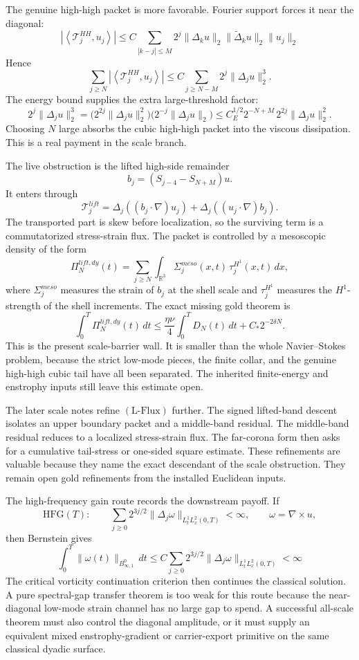 The genuine high-high packet is more favorable.  Fourier support forces it
near the diagonal:
\[
  \left|
  \left\langle
  \mathcal T^{HH}_j,u_j
  \right\rangle
  \right|
  \le
  C\sum_{|k-j|\le M}
  2^j\|\Delta_k u\|_2
  \|\widetilde\Delta_k u\|_2
  \|u_j\|_2
\]
Hence
\[
  \sum_{j\ge N}
  \left|
  \left\langle
  \mathcal T^{HH}_j,u_j
  \right\rangle
  \right|
  \le
  C\sum_{j\ge N-M}2^j\|\Delta_j u\|_2^3.
\]
The energy bound supplies the extra large-threshold factor:
\[
  2^j\|\Delta_j u\|_2^3
  =
  \bigl(2^{2j}\|\Delta_j u\|_2^2\bigr)
  \bigl(2^{-j}\|\Delta_j u\|_2\bigr)
  \le
  C_E^{1/2}2^{-N+M}\,
  2^{2j}\|\Delta_j u\|_2^2.
\]
Choosing \(N\) large absorbs the cubic high-high packet into the viscous
dissipation.  This is a real payment in the scale branch.

The live obstruction is the lifted high-side remainder
\[
  b_j=(S_{j-4}-S_{N+M})u.
\]
It enters through
\[
  \mathcal T^{lift}_j
  =
  \Delta_j((b_j\cdot\nabla)u_j)
  +
  \Delta_j((u_j\cdot\nabla)b_j).
\]
The transported part is skew before localization, so the surviving term is
a commutatorized stress-strain flux.  The packet is controlled by a
mesoscopic density of the form
\[
  \Pi_N^{lift,dy}(t)
  =
  \sum_{j\ge N}
  \int_{\mathbb R^3}
  \Sigma^{meso}_j(x,t)\,
  \tau^{H^1}_j(x,t)\,dx,
\]
where \(\Sigma^{meso}_j\) measures the strain of \(b_j\) at the shell scale
and \(\tau^{H^1}_j\) measures the \(H^1\)-strength of the shell increments.
The exact missing gold theorem is
\[
  \int_0^T\Pi_N^{lift,dy}(t)\,dt
  \le
  \frac{\eta\nu}{4}\int_0^TD_N(t)\,dt
  +C_*2^{-2\delta N}.
  \tag{L-Flux}
\]
This is the present scale-barrier wall.  It is smaller than the whole
Navier--Stokes problem, because the strict low-mode pieces, the finite collar,
and the genuine high-high cubic tail have all been separated.  The inherited
finite-energy and enstrophy inputs still leave this estimate open.

The later scale notes refine \((\mathrm{L\text{-}Flux})\) further.  The
signed lifted-band descent isolates an upper boundary packet and a middle-band
residual.  The middle-band residual reduces to a localized stress-strain flux.
The far-corona form then asks for a cumulative tail-stress or one-sided
square estimate.  These refinements are valuable because they name the exact
descendant of the scale obstruction.  They remain open gold refinements
from the installed Euclidean inputs.

The high-frequency gain route records the downstream payoff.  If
\[
  \mathrm{HFG}(T):
  \qquad
  \sum_{j\ge0}2^{3j/2}
  \|\Delta_j\omega\|_{L^1_tL^2_x(0,T)}
  <\infty,
  \qquad \omega=\nabla\times u,
\]
then Bernstein gives
\[
  \int_0^T\|\omega(t)\|_{B^0_{\infty,1}}\,dt
  \le
  C\sum_{j\ge0}2^{3j/2}
  \|\Delta_j\omega\|_{L^1_tL^2_x(0,T)}
  <\infty
\]
The critical vorticity continuation criterion then continues the classical
solution.  A pure spectral-gap transfer theorem is too weak for this route
because the near-diagonal low-mode strain channel has no large gap to spend.
A successful all-scale theorem must also control the diagonal amplitude, or
it must supply an equivalent mixed enstrophy-gradient or carrier-export
primitive on the same classical dyadic surface.

